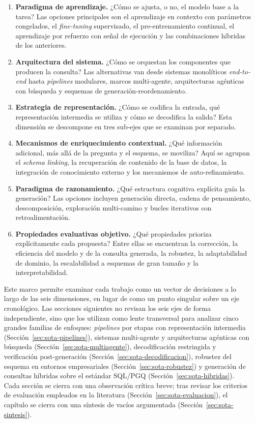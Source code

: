 \begin{enumerate}
    \item \textbf{Paradigma de aprendizaje.} ¿Cómo se ajusta, o no, el modelo
    base a la tarea? Las opciones principales son el aprendizaje en contexto
    con parámetros congelados, el \emph{fine-tuning} supervisado, el
    pre-entrenamiento continual, el aprendizaje por refuerzo con señal de
    ejecución y las combinaciones híbridas de los anteriores.
    \item \textbf{Arquitectura del sistema.} ¿Cómo se orquestan los componentes
    que producen la consulta? Las alternativas van desde sistemas monolíticos
    \emph{end-to-end} hasta \emph{pipelines} modulares, marcos multi-agente,
    arquitecturas agénticas con búsqueda y esquemas de generación-reordenamiento.
    \item \textbf{Estrategia de representación.} ¿Cómo se codifica la entrada,
    qué representación intermedia se utiliza y cómo se decodifica la salida?
    Esta dimensión se descompone en tres sub-ejes que se examinan por separado.
    \item \textbf{Mecanismos de enriquecimiento contextual.} ¿Qué información
    adicional, más allá de la pregunta y el esquema, se moviliza? Aquí se
    agrupan el \emph{schema linking}, la recuperación de contenido de la base
    de datos, la integración de conocimiento externo y los mecanismos de
    auto-refinamiento.
    \item \textbf{Paradigma de razonamiento.} ¿Qué estructura cognitiva
    explícita guía la generación? Las opciones incluyen generación directa,
    cadena de pensamiento, descomposición, exploración multi-camino y bucles
    iterativos con retroalimentación.
    \item \textbf{Propiedades evaluativas objetivo.} ¿Qué propiedades prioriza
    explícitamente cada propuesta? Entre ellas se encuentran la corrección, la
    eficiencia del modelo y de la consulta generada, la robustez, la
    adaptabilidad de dominio, la escalabilidad a esquemas de gran tamaño y la
    interpretabilidad.
\end{enumerate}

Este marco permite examinar cada trabajo como un vector de decisiones a lo
largo de las seis dimensiones, en lugar de como un punto singular sobre un
eje cronológico. Las secciones siguientes no revisan los seis ejes de
forma independiente, sino que los utilizan como lente transversal para
analizar cinco grandes familias de enfoques: \emph{pipelines} por etapas
con representación intermedia (Sección~\ref{sec:sota-pipelines}),
sistemas multi-agente y arquitecturas agénticas con búsqueda
(Sección~\ref{sec:sota-multiagente}), decodificación restringida y
verificación post-generación (Sección~\ref{sec:sota-decodificacion}),
robustez del esquema en entornos empresariales (Sección~\ref{sec:sota-robustez})
y generación de consultas híbridas sobre el estándar \ac{SQL}/\ac{PGQ}
(Sección~\ref{sec:sota-hibridas}). Cada sección se cierra con una
observación crítica breve; tras revisar los criterios de evaluación
empleados en la literatura (Sección~\ref{sec:sota-evaluacion}), el
capítulo se cierra con una síntesis de vacíos argumentada
(Sección~\ref{sec:sota-sintesis}). 

